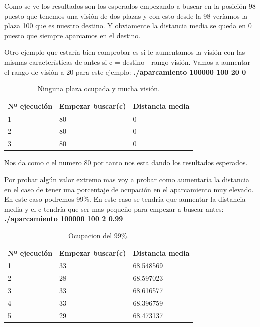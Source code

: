 \documentclass[]{article}
\begin{document}
Como se ve los resultados son los esperados empezando a buscar en la posición 98 puesto que tenemos una visión de dos plazas y con esto desde la 98 veríamos la plaza 100 que es nuestro destino. Y obviamente la distancia media se queda en 0 puesto que siempre aparcamos en el destino. 

Otro ejemplo que estaría bien comprobar es si le aumentamos la visión con las mismas características de antes si c = destino - rango visión. Vamos a aumentar el rango de visión a 20 para este ejemplo: 
\textbf{./aparcamiento 100000 100 20 0 }
 
 \begin{table}[htbp]
	\begin{center}
		\begin{tabular}{|l|l|l|}
			\hline
			Nº ejecución & Empezar buscar(c) & Distancia media \\
			\hline \hline
			1 & 80&0
			\\ \hline
			2 & 80&0
			\\ \hline
			3 & 80&0
			\\ \hline
		\end{tabular}
		\caption{Ninguna plaza ocupada y mucha visión.}
		\label{tabla:sencilla}
	\end{center}
\end{table}
 
Nos da como c el numero 80 por tanto nos esta dando los resultados esperados. 

Por probar algún valor extremo mas voy a probar como aumentaría la distancia en el caso de tener una porcentaje de ocupación en el aparcamiento muy elevado. En este caso podremos 99\%. En este caso se tendría que aumentar la distancia media y el c tendría que ser mas pequeño para empezar a buscar antes:
\textbf{./aparcamiento 100000 100 2 0.99}
 \begin{table}[htbp]
	\begin{center}
		\begin{tabular}{|l|l|l|}
			\hline
			Nº ejecución & Empezar buscar(c) & Distancia media \\
			\hline \hline
			1 & 33&68.548569
			\\ \hline
			2 & 28&68.597023
			\\ \hline
			3 & 33&68.616577
			\\ \hline
			4 & 33&68.396759
			\\ \hline
			5 & 29&68.473137
			\\ \hline
		\end{tabular}
		\caption{Ocupacion del 99\%.}
		\label{tabla:sencilla}
	\end{center}
\end{table}
\end{document}
